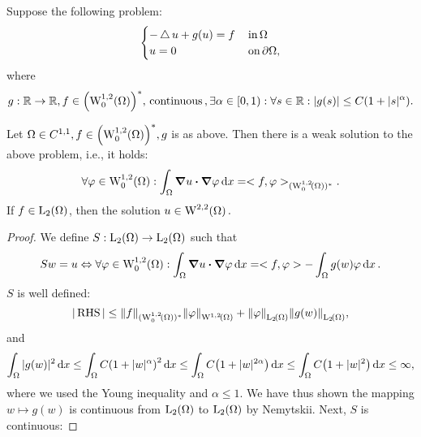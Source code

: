 \documentclass{article}
\begin{document}
\begin{example}
    Suppose the following problem: 
    \[
	    \begin{cases}
		    -\operatorname{\bigtriangleup} u + g(u) = f & \, \text{in} \, \Omega\\
		    u = 0 & \, \text{on} \, \partial \Omega,
	    \end{cases}
    \]
    where
    \[
	    g: \R \to \R, f \in \qty(\WkpzeroSet[1][2]{\Omega})^{*}, \, \text{continuous} \,, \exists \alpha \in [0,1): \forall s \in \R: |g(s)|\leq C\qty(1+|s|^{\alpha}).
    \]

    \begin{theorem}[Existence]
        Let $ \Omega \in C^{1,1}, f \in \qty(\WkpzeroSet[1][2]{\Omega})^{*}, g$ is as above. Then there is a weak solution to the above problem, i.e., it holds:
	\[
		\forall \varphi \in \WkpzeroSet[1][2]{\Omega}: \int_{\Omega}\grad u \vdot \grad \varphi\dd{x} = <f,\varphi>_{(\WkpzeroSet[1][2]{\Omega})^{*}}.
	\]
	If $f \in \LpSet[2]{\Omega}$, then the solution $u \in \WkpSet[2][2]{\Omega}.$
    \end{theorem}
    \begin{proof}
        We define $S: \LpSet[2]{\Omega} \to \LpSet[2]{\Omega}$ such that
	\[
		Sw = u \Leftrightarrow \forall \varphi \in \WkpzeroSet[1][2]{\Omega}: \int_{\Omega}\grad u \vdot \grad \varphi\dd{x} = <f,\varphi> - \int_{\Omega}g(w) \varphi\dd{x}.
	\]
	$S$ is well defined:
	\[
		|\, \text{RHS} \,| \leq \norm{f}_{(\WkpzeroSet[1][2]{\Omega})^{*}} \norm{\varphi}_{\WkpSet[1][2]{\Omega}} + \norm{\varphi}_{\LpSet[2]{\Omega}} \norm{g(w)}_{\LpSet[2]{\Omega}},
	\] and
	\[
		\int_{\Omega}|g(w)|^{2}\dd{x} \leq \int_{\Omega}C\qty(1+|w|^{\alpha})^{2}\dd{x} \leq \int_{\Omega}C\qty(1+|w|^{2 \alpha})\dd{x} \leq \int_{\Omega}C\qty(1+|w|^2)\dd{x} \leq \infty,
	\]
	where we used the Young inequality and $\alpha \leq 1$. We have thus shown the mapping $w \mapsto g(w)$ is continuous from $\LpSet[2]{\Omega}$ to $\LpSet[2]{\Omega}$ by Nemytskii.
	Next, $S$ is continuous: 
\end{proof}
\end{example}
\end{document}
